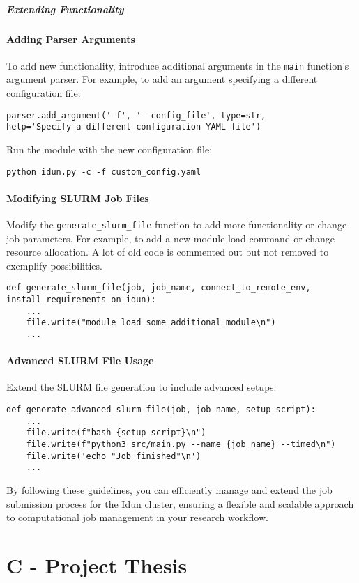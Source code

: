 \paragraph{Extending Functionality}

\subsubsection{Adding Parser Arguments}

To add new functionality, introduce additional arguments in the \texttt{main} function's argument parser. For example, to add an argument specifying a different configuration file:
\begin{verbatim}
parser.add_argument('-f', '--config_file', type=str, 
help='Specify a different configuration YAML file')
\end{verbatim}

Run the module with the new configuration file:
\begin{verbatim}
python idun.py -c -f custom_config.yaml
\end{verbatim}

\subsubsection{Modifying SLURM Job Files}

Modify the \texttt{generate\_slurm\_file} function to add more functionality or change job parameters. For example, to add a new module load command or change resource allocation. A lot of old code is commented out but not removed to exemplify possibilities.
\begin{verbatim}
def generate_slurm_file(job, job_name, connect_to_remote_env,
install_requirements_on_idun):
    ...
    file.write("module load some_additional_module\n")
    ...
\end{verbatim}

\subsubsection{Advanced SLURM File Usage}

Extend the SLURM file generation to include advanced setups:
\begin{verbatim}
def generate_advanced_slurm_file(job, job_name, setup_script):
    ...
    file.write(f"bash {setup_script}\n")
    file.write(f"python3 src/main.py --name {job_name} --timed\n")
    file.write('echo "Job finished"\n')
    ...
\end{verbatim}

By following these guidelines, you can efficiently manage and extend the job submission process for the Idun cluster, ensuring a flexible and scalable approach to computational job management in your research workflow.

\chapter{C - Project Thesis}
\label{Appendix C}



